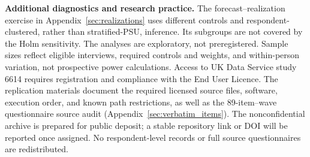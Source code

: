 \textbf{Additional diagnostics and research practice.} The forecast--realization exercise in Appendix~\ref{sec:realizations} uses different controls and respondent-clustered, rather than stratified-PSU, inference. Its subgroups are not covered by the Holm sensitivity. The analyses are exploratory, not preregistered. Sample sizes reflect eligible interviews, required controls and weights, and within-person variation, not prospective power calculations. Access to UK Data Service study 6614 requires registration and compliance with the End User Licence. The replication materials document the required licensed source files, software, execution order, and known path restrictions, as well as the 89-item--wave questionnaire source audit (Appendix~\ref{sec:verbatim_items}). The nonconfidential archive is prepared for public deposit; a stable repository link or DOI will be reported once assigned. No respondent-level records or full source questionnaires are redistributed.
